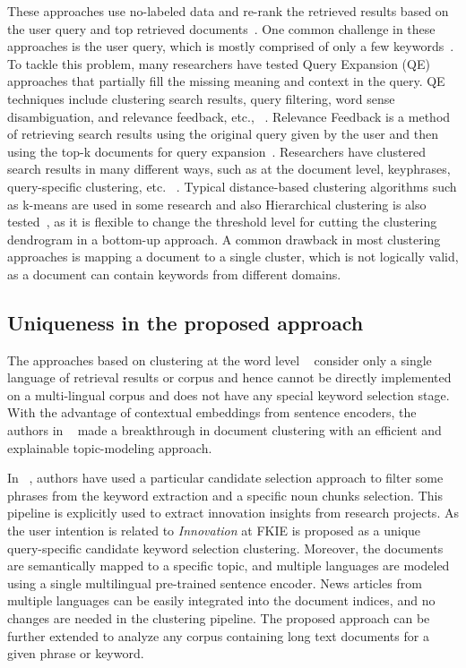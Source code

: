 \documentclass[master,proposal,extern,palatino]{rgseThesis}
\begin{document}
These approaches use no-labeled data and re-rank the retrieved results based on the user query and top retrieved documents~\cite{rohatgi2020psu, azad2019query}. One common challenge in these approaches is the user query, which is mostly comprised of only a few keywords~\cite{azad2019query, Kankaria2015QueryET}. To tackle this problem, many
researchers have tested Query Expansion (QE) approaches that partially fill the missing meaning and
context in the query. QE techniques include clustering search results, query filtering, word sense disambiguation, and relevance feedback, etc., ~\cite{azad2019query}. Relevance Feedback is a method of retrieving search results using the original query given by the user and then using the top-k documents for query expansion~\cite{azad2019query}. Researchers have clustered search results in many different ways, such as at the document level, keyphrases, query-specific clustering, etc. ~\cite{bernardini2009full, kurland2008rank, zamir1998web, osinski2005concept, liu2004cluster, liu2006representing}. Typical distance-based clustering algorithms such as k-means are used in some research and also Hierarchical clustering is also tested~\cite{bernardini2009full, mehlitz2007new, yuan2022measurement}, as it is flexible to change the threshold level for cutting the clustering dendrogram in a bottom-up approach. A common drawback in most clustering approaches is mapping a document to a single cluster, which is not logically valid, as a document can contain keywords from different domains. 

\subsection{Uniqueness in the proposed approach}

The approaches based on clustering at the word level ~\cite{bernardini2009full, mehlitz2007new} consider only a single language of retrieval results or corpus and hence cannot be directly implemented on a multi-lingual corpus and does not have any special keyword selection stage. With the advantage of contextual embeddings from sentence encoders, the authors in ~\cite{angelov2020top2vec} made a breakthrough in document clustering with an efficient and explainable topic-modeling approach.  

 In ~\cite{malloci2020text},  authors have used a particular candidate selection approach to filter some phrases from the keyword extraction and a specific noun chunks selection. This pipeline is explicitly used to extract innovation insights from research projects. As the user intention is related to \textit{Innovation} at FKIE is proposed as a unique query-specific candidate keyword selection clustering. Moreover, the documents are semantically mapped to a specific topic, and multiple languages
 are modeled using a single multilingual pre-trained sentence encoder. News articles from multiple languages can be easily integrated into the document indices, and no changes are needed in the clustering pipeline. The proposed approach can be further extended to analyze any corpus containing long text documents for a given phrase or keyword. 


\printbibliography[heading=bibintoc]
\end{document}
